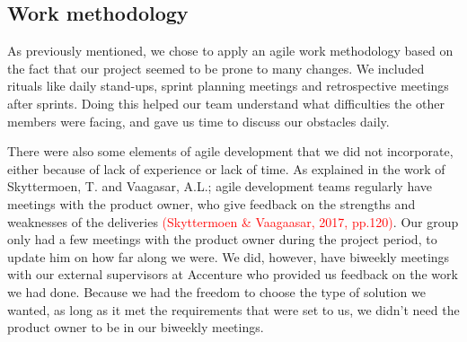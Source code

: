 \subsection{Work methodology}
As previously mentioned, we chose to apply an agile work methodology based on the fact that our project seemed to be prone to many changes. We included rituals like daily stand-ups, sprint planning meetings and retrospective meetings after sprints. Doing this helped our team understand what difficulties the other members were facing, and gave us time to discuss our obstacles daily. 

There were also some elements of agile development that we did not incorporate, either because of lack of experience or lack of time. As explained in the work of  Skyttermoen, T. and Vaagasar, A.L.; agile development teams regularly have meetings with the product owner, who give feedback on the strengths and weaknesses of the deliveries \textcolor{red}{(Skyttermoen \& Vaagaasar, 2017, pp.120)}. Our group only had a few meetings with the product owner during the project period, to update him on how far along we were. We did, however,  have biweekly meetings with our external supervisors at Accenture who provided us feedback on the work we had done. Because we had the freedom to choose the type of solution we wanted, as long as it met the requirements that were set to us, we didn’t need the product owner to be in our biweekly meetings. 